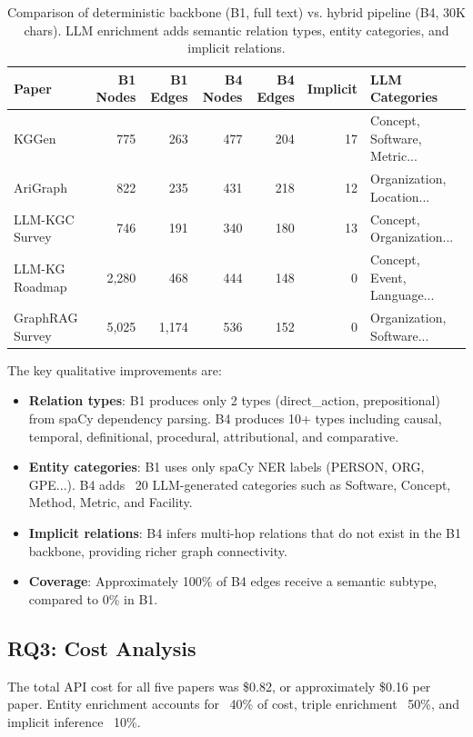 \documentclass{article}
\begin{document}
\begin{table}[t]
\centering
\caption{Comparison of deterministic backbone (B1, full text) vs. hybrid pipeline (B4, 30K chars). LLM enrichment adds semantic relation types, entity categories, and implicit relations.}
\label{tab:enrichment}
\begin{tabular}{lrrrrrl}
\toprule
Paper & B1 Nodes & B1 Edges & B4 Nodes & B4 Edges & Implicit & LLM Categories \\
\midrule
KGGen & 775 & 263 & 477 & 204 & 17 & Concept, Software, Metric... \\
AriGraph & 822 & 235 & 431 & 218 & 12 & Organization, Location... \\
LLM-KGC Survey & 746 & 191 & 340 & 180 & 13 & Concept, Organization... \\
LLM-KG Roadmap & 2,280 & 468 & 444 & 148 & 0 & Concept, Event, Language... \\
GraphRAG Survey & 5,025 & 1,174 & 536 & 152 & 0 & Organization, Software... \\
\bottomrule
\end{tabular}
\end{table}

The key qualitative improvements are:
\begin{itemize}
    \item \textbf{Relation types}: B1 produces only 2 types (direct\_action, prepositional) from spaCy dependency parsing. B4 produces 10+ types including causal, temporal, definitional, procedural, attributional, and comparative.
    \item \textbf{Entity categories}: B1 uses only spaCy NER labels (PERSON, ORG, GPE...). B4 adds ~20 LLM-generated categories such as Software, Concept, Method, Metric, and Facility.
    \item \textbf{Implicit relations}: B4 infers multi-hop relations that do not exist in the B1 backbone, providing richer graph connectivity.
    \item \textbf{Coverage}: Approximately 100\% of B4 edges receive a semantic subtype, compared to 0\% in B1.
\end{itemize}

\subsection{RQ3: Cost Analysis}

The total API cost for all five papers was \$0.82, or approximately \$0.16 per paper. Entity enrichment accounts for ~40\% of cost, triple enrichment ~50\%, and implicit inference ~10\%.
\end{document}
